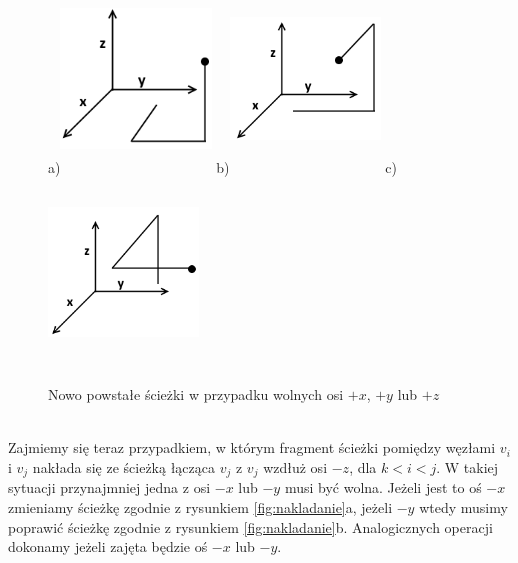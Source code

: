 \documentclass[brudnopis]{xmgr}
\theoremstyle{definition}
\begin{document}
\begin{figure}[ht!]
  \centering
  a)\includegraphics[width=4cm,height=5cm]{rysunki/wolne_x.png}
  b)\includegraphics[width=4cm,height=5cm]{rysunki/wolne_y.png}
  c)\includegraphics[width=4cm,height=5cm]{rysunki/wolne_z.png}
  \caption{Nowo powstałe ścieżki w przypadku wolnych osi $+x$, $+y$ lub $+z$}
  \label{fig:nowe sciezki}
\end{figure} 
\\\indent Zajmiemy się teraz przypadkiem, w którym fragment ścieżki pomiędzy węzłami $v_i$ i $v_j$ nakłada się ze ścieżką łącząca $v_j$ z $v_j$ wzdłuż osi $-z$, dla $k < i < j$. W takiej sytuacji przynajmniej jedna z osi $-x$ lub $-y$ musi być wolna. Jeżeli jest to oś $-x$ zmieniamy ścieżkę zgodnie z rysunkiem \ref{fig:nakladanie}a, jeżeli $-y$ wtedy musimy poprawić ścieżkę zgodnie z rysunkiem \ref{fig:nakladanie}b. Analogicznych operacji dokonamy jeżeli zajęta będzie oś $-x$ lub $-y$.
\end{document}

